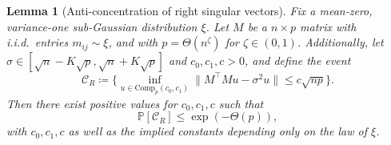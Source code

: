 \documentclass[11pt]{article}
\numberwithin{equation}{section}
\newtheorem{lemma}[theorem]{Lemma}
\theoremstyle{remark}
\newcommand{\Comp}{\mathrm{Comp}}
\begin{document}
\begin{lemma}[Anti-concentration of right singular vectors]\label{lem-incompressible-fixed-val-right}
    Fix a mean-zero, variance-one sub-Gaussian distribution $\xi$. Let $M$ be a $n \times p$ matrix with i.i.d.\ entries $m_{ij} \sim \xi$, and with $p = \Theta(n^{\zeta})$ for $\zeta \in (0, 1)$. Additionally, let $\sigma \in [\sqrt{n} - K\sqrt{p}, \sqrt{n} + K\sqrt{p}]$ and $c_0, c_1, c > 0$, and define the event
    \begin{equation}\label{eq-incompressible-fixed-val-1}
        \mathcal{C}_R \coloneqq \bigg\{ \inf_{u \in \Comp_p(c_0, c_1)}\| M^\top M u - \sigma^2 u \| \leq c \sqrt{np} \bigg\}.
    \end{equation}
    Then there exist positive values for $c_0, c_1, c$ such that
    \begin{equation}\label{eq-incompressible-fixed-val-3}
        \mathbb{P}[\mathcal{C}_R] \leq \exp(- \Theta(p)),
    \end{equation}
    with $c_0, c_1, c$ as well as the implied constants depending only on the law of $\xi$.
\end{lemma}
\end{document}
